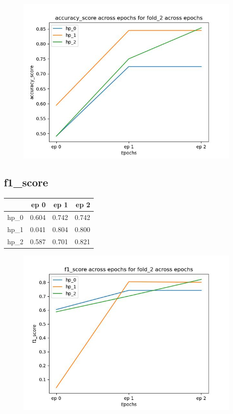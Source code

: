 \documentclass{article}
\begin{document}
\begin{figure}[H]
\includegraphics[scale = 0.75]{fold_2/accuracy_score}
\end{figure}
\subsection{f1\_score}
\begin{tabular}{lrrr}
\toprule
{} &   ep 0 &   ep 1 &   ep 2 \\
\midrule
hp\_0 &  0.604 &  0.742 &  0.742 \\
hp\_1 &  0.041 &  0.804 &  0.800 \\
hp\_2 &  0.587 &  0.701 &  0.821 \\
\bottomrule
\end{tabular}

\begin{figure}[H]
\includegraphics[scale = 0.75]{fold_2/f1_score}
\end{figure}
\end{document}
